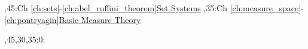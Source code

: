 
\bgroup
\renewcommand{\href}[1]{} %
\hypersetup{linkcolor=black} %
\renewcommand{\solidwidth}{0.7pt}
\renewcommand{\boldwidth}{1.5pt}

\setcounter{diagheight}{50}
\begin{chart}
,45:{Ch \ref*{ch:sets}-\ref*{ch:abel_ruffini_theorem}}{\hyperref[part:startout]{Set Systems}}{}
,35:{Ch \ref*{ch:measure_space}-\ref*{ch:pontryagin}}{\hyperref[part:measure]{Basic Measure Theory}}{}

,45,30,35;0:    %
\end{chart}
\egroup
